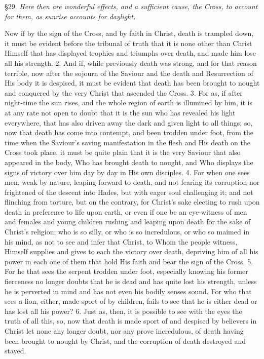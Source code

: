 §29. \emph{Here then are wonderful effects, and a sufficient cause, the Cross, to account for them, as sunrise accounts for daylight.}

Now if by the sign of the Cross, and by faith in Christ, death is trampled down, it must be evident before the tribunal of truth that it is none other than Christ Himself that has displayed trophies and triumphs over death, and made him lose all his strength. 2. And if, while previously death was strong, and for that reason terrible, now after the sojourn of the Saviour and the death and Resurrection of His body it is despised, it must be evident that death has been brought to nought and conquered by the very Christ that ascended the Cross. 3. For as, if after night-time the sun rises, and the whole region of earth is illumined by him, it is at any rate not open to doubt that it is the sun who has revealed his light everywhere, that has also driven away the dark and given light to all things; so, now that death has come into contempt, and been trodden under foot, from the time when the Saviour’s saving manifestation in the flesh and His death on the Cross took place, it must be quite plain that it is the very Saviour that also appeared in the body, Who has brought death to nought, and Who displays the signs of victory over him day by day in His own disciples. 4. For when one sees men, weak by nature, leaping forward to death, and not fearing its corruption nor frightened of the descent into Hades, but with eager soul challenging it; and not flinching from torture, but on the contrary, for Christ’s sake electing to rush upon death in preference to life upon earth, or even if one be an eye-witness of men and females and young children rushing and leaping upon death for the sake of Christ’s religion; who is so silly, or who is so incredulous, or who so maimed in his mind, as not to see and infer that Christ, to Whom the people witness, Himself supplies and gives to each the victory over death, depriving him of all his power in each one of them that hold His faith and bear the sign of the Cross. 5. For he that sees the serpent trodden under foot, especially knowing his former fierceness no longer doubts that he is dead and has quite lost his strength, unless he is perverted in mind and has not even his bodily senses sound. For who that sees a lion, either, made sport of by children, fails to see that he is either dead or has lost all his power? 6. Just as, then, it is possible to see with the eyes the truth of all this, so, now that death is made sport of and despised by believers in Christ let none any longer doubt, nor any prove incredulous, of death having been brought to nought by Christ, and the corruption of death destroyed and stayed.

